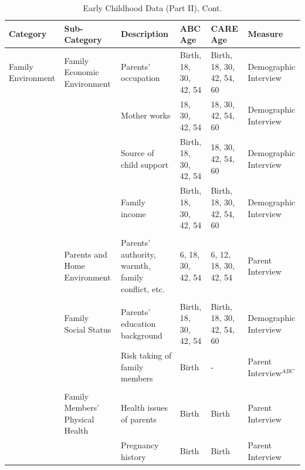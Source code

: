 \documentclass[static]{JJH-Beamer}
\begin{document}
\begin{frame}
 \addtocounter{framenumber}{-1}

\begin{table}[H]
\addtocounter{table}{-1}
\caption{Early Childhood Data (Part II), Cont.}
\begin{center}
\begin{tiny}
\begin{tabular}{L{1.3cm} C{1.8cm} C{2cm} C{1.3cm} C{1.3cm}  C{2cm}}
\toprule
\textbf{Category}	&	\textbf{Sub-Category}	&	\textbf{Description}	&	\textbf{ABC Age}  	&  \textbf{CARE Age}  & 	\textbf{Measure}	\\ \midrule
Family Environment	&	Family Economic Environment	&	Parents' occupation	&	Birth, 18, 30, 42, 54	& 	Birth, 18, 30, 42, 54, 60		&	Demographic Interview	\\
	&								& Mother works & 18, 30, 42, 54 & 18, 30, 42, 54, 60 & Demographic Interview \\
    &		&	Source of child support	&	Birth, 18, 30, 42, 54	&	18, 30, 42, 54, 60	&	Demographic Interview	\\
	&		&	Family income	&	Birth, 18, 30, 42, 54	&	Birth, 18, 30, 42, 54, 60	&	Demographic Interview	\\
	&	\\
	&	Parents and Home Environment & Parents' authority, warmth, family conflict, etc. & 6, 18, 30, 42, 54 & 6, 12, 18, 30, 42, 54 & Parent Interview \\
	&	\\
	&	Family Social Status	&	Parents' education background	&	Birth, 18, 30, 42, 54	&	Birth, 18, 30, 42, 54, 60		&	Demographic Interview	\\
	&		&	Risk taking of family members	&	Birth	&	- 	&	Parent Interview$^{ABC}$	\\
	&	\\
	&	Family Members' Physical Health	&	Health issues of parents	&	Birth	&	Birth	&	Parent Interview	\\
	&		&	Pregnancy history	&	Birth	&	Birth	&	Parent Interview	\\
\bottomrule
\end{tabular}
\end{tiny}
\end{center}
\end{table}

\end{frame}
\end{document}
